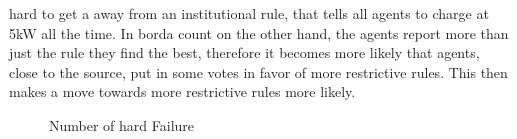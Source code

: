 \documentclass[a4paper]{article}
\begin{document}
hard to get a away from an institutional rule, that tells all agents to charge at 5kW all the time. In borda count on the other hand, 
the agents report more than just the rule they find the best, therefore it becomes more likely that agents, close to the source, put in 
some votes in favor of more restrictive rules. This then makes a move towards more restrictive rules more likely.  
\begin{figure}[!ht]
\caption{Number of hard Failure}
\label{d_colored_rules}
\end{figure}
\end{document}
